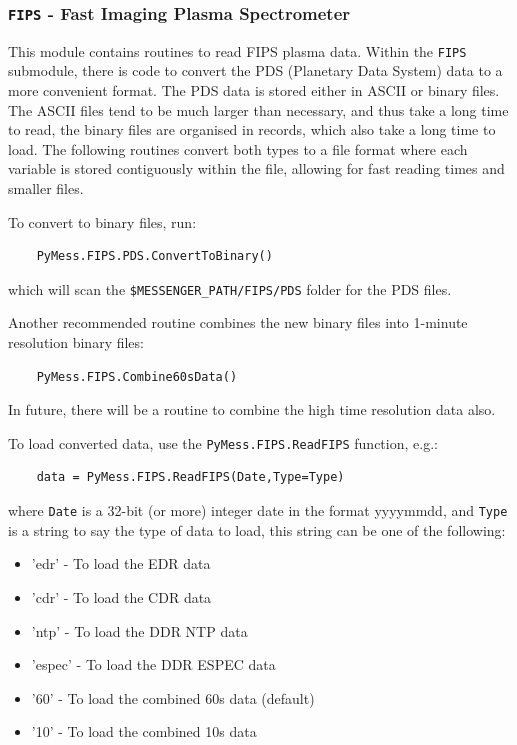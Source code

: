 	\subsubsection{\texttt{FIPS} - Fast Imaging Plasma Spectrometer}
	
	This module contains routines to read FIPS plasma data. Within the \texttt{FIPS}
	submodule, there is code to convert the PDS (Planetary Data System) data
	to a more convenient format. The PDS data is stored either in ASCII or
	binary files. The ASCII files tend to be much larger than necessary, and 
	thus take a long time to read, the binary files are organised in records,
	which also take a long time to load. The following routines convert both
	types to a file format where each variable is stored contiguously within
	the file, allowing for fast reading times and smaller files.
	
	To convert to binary files, run:
	
	\begin{verbatim}
	PyMess.FIPS.PDS.ConvertToBinary()
	\end{verbatim}
	
	which will scan the \texttt{\$MESSENGER\_PATH/FIPS/PDS} folder for the PDS files.
	
	Another recommended routine combines the new binary files into 1-minute 
	resolution binary files:
	
	\begin{verbatim}
	PyMess.FIPS.Combine60sData()
	\end{verbatim}
	
	In future, there will be a routine to combine the high time resolution 
	data also.
	
	To load converted data, use the \texttt{PyMess.FIPS.ReadFIPS} 
	function, e.g.:
	
	\begin{verbatim}
	data = PyMess.FIPS.ReadFIPS(Date,Type=Type)
	\end{verbatim}
	
	where \texttt{Date} is a 32-bit (or more) integer date in the format yyyymmdd,
	and \texttt{Type} is a string to say the type of data to load, this string can
	be one of the following:
		
		\begin{itemize}
			\item 'edr' - To load the EDR data
			\item 'cdr' - To load the CDR data
			\item 'ntp' - To load the DDR NTP data
			\item 'espec' - To load the DDR ESPEC data
			\item '60' - To load the combined 60s data (default)
			\item '10' - To load the combined 10s data
		\end{itemize}
	
